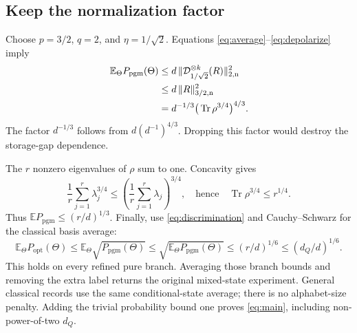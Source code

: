 \documentclass[11pt,a4paper]{article}
\newcommand{\Tr}{\operatorname{Tr}}
\newcommand{\E}{\mathbb E}
\newcommand{\pgm}{P_{\mathrm{pgm}}}
\newcommand{\popt}{P_{\mathrm{opt}}}
\newcommand{\Dmap}{\mathcal D}
\newcommand{\normn}[2]{\lVert #1\rVert_{#2,\mathrm n}}
\begin{document}
\subsection{Keep the normalization factor}
Choose $p=3/2$, $q=2$, and $\eta=1/\sqrt2$. Equations \eqref{eq:average}--\eqref{eq:depolarize} imply
\begin{align}
\E_\Theta\pgm(\Theta)
&\leq d\,\normn{\Dmap_{1/\sqrt2}^{\otimes k}(R)}{2}^{2}\notag\\
&\leq d\,\normn{R}{3/2}^{2}\notag\\
&=d^{-1/3}\big(\Tr\rho^{3/4}\big)^{4/3}.\label{eq:hc-use}
\end{align}
The factor $d^{-1/3}$ follows from $d(d^{-1})^{4/3}$. Dropping this factor would destroy the storage-gap dependence.

The $r$ nonzero eigenvalues of $\rho$ sum to one. Concavity gives
\[
\frac1r\sum_{j=1}^r\lambda_j^{3/4}
\leq\left(\frac1r\sum_{j=1}^r\lambda_j\right)^{3/4},
\quad\text{hence}\quad\Tr\rho^{3/4}\leq r^{1/4}.
\]
Thus $\E\pgm\leq(r/d)^{1/3}$. Finally, use \eqref{eq:discrimination} and Cauchy--Schwarz for the classical basis average:
\begin{equation}\label{eq:finish}
\E_\Theta\popt(\Theta)
\leq\E_\Theta\sqrt{\pgm(\Theta)}
\leq\sqrt{\E_\Theta\pgm(\Theta)}
\leq(r/d)^{1/6}\leq(d_Q/d)^{1/6}.
\end{equation}
This holds on every refined pure branch. Averaging those branch bounds and removing the extra label returns the original mixed-state experiment. General classical records use the same conditional-state average; there is no alphabet-size penalty. Adding the trivial probability bound one proves \eqref{eq:main}, including non-power-of-two $d_Q$.
\end{document}
